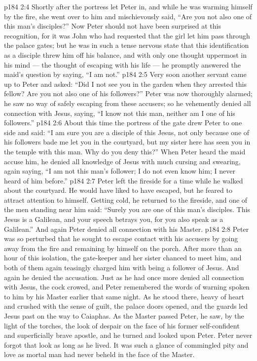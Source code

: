\vs p184 2:4 Shortly after the portress let Peter in, and while he was warming himself by the fire, she went over to him and mischievously said, “Are you not also one of this man’s disciples?” Now Peter should not have been surprised at this recognition, for it was John who had requested that the girl let him pass through the palace gates; but he was in such a tense nervous state that this identification as a disciple threw him off his balance, and with only one thought uppermost in his mind --- the thought of escaping with his life --- he promptly answered the maid’s question by saying, “I am not.”
\vs p184 2:5 Very soon another servant came up to Peter and asked: “Did I not see you in the garden when they arrested this fellow? Are you not also one of his followers?” Peter was now thoroughly alarmed; he saw no way of safely escaping from these accusers; so he vehemently denied all connection with Jesus, saying, “I know not this man, neither am I one of his followers.”
\vs p184 2:6 About this time the portress of the gate drew Peter to one side and said: “I am sure you are a disciple of this Jesus, not only because one of his followers bade me let you in the courtyard, but my sister here has seen you in the temple with this man. Why do you deny this?” When Peter heard the maid accuse him, he denied all knowledge of Jesus with much cursing and swearing, again saying, “I am not this man’s follower; I do not even know him; I never heard of him before.”
\vs p184 2:7 Peter left the fireside for a time while he walked about the courtyard. He would have liked to have escaped, but he feared to attract attention to himself. Getting cold, he returned to the fireside, and one of the men standing near him said: “Surely you are one of this man’s disciples. This Jesus is a Galilean, and your speech betrays you, for you also speak as a Galilean.” And again Peter denied all connection with his Master.
\vs p184 2:8 Peter was so perturbed that he sought to escape contact with his accusers by going away from the fire and remaining by himself on the porch. After more than an hour of this isolation, the gate\hyp{}keeper and her sister chanced to meet him, and both of them again teasingly charged him with being a follower of Jesus. And again he denied the accusation. Just as he had once more denied all connection with Jesus, the cock crowed, and Peter remembered the words of warning spoken to him by his Master earlier that same night. As he stood there, heavy of heart and crushed with the sense of guilt, the palace doors opened, and the guards led Jesus past on the way to Caiaphas. As the Master passed Peter, he saw, by the light of the torches, the look of despair on the face of his former self\hyp{}confident and superficially brave apostle, and he turned and looked upon Peter. Peter never forgot that look as long as he lived. It was such a glance of commingled pity and love as mortal man had never beheld in the face of the Master.
